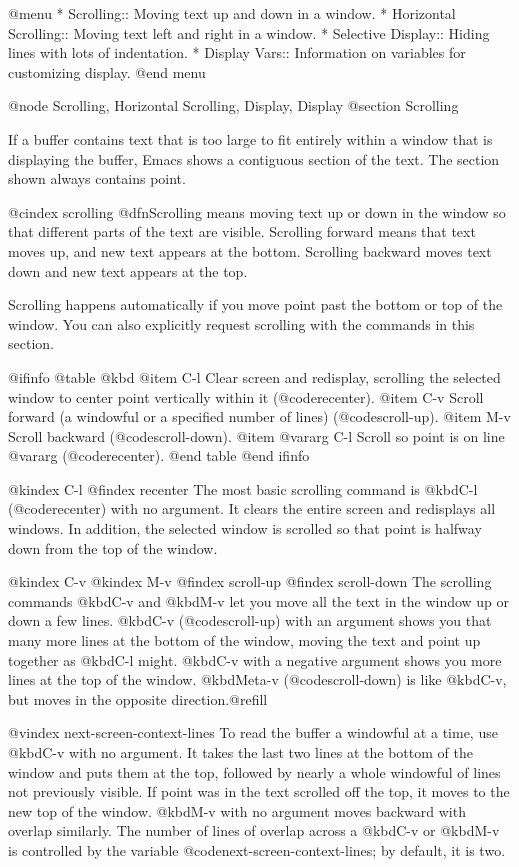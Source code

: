 {{{{{{{{@menu
* Scrolling::	           Moving text up and down in a window.
* Horizontal Scrolling::   Moving text left and right in a window.
* Selective Display::      Hiding lines with lots of indentation.
* Display Vars::           Information on variables for customizing display.
@end menu

@node Scrolling, Horizontal Scrolling, Display, Display
@section Scrolling

  If a buffer contains text that is too large to fit entirely within a
window that is displaying the buffer, Emacs shows a contiguous section of
the text.  The section shown always contains point.

@cindex scrolling
  @dfn{Scrolling} means moving text up or down in the window so that
different parts of the text are visible.  Scrolling forward means that text
moves up, and new text appears at the bottom.  Scrolling backward moves
text down and new text appears at the top.

  Scrolling happens automatically if you move point past the bottom or top
of the window.  You can also explicitly request scrolling with the commands
in this section.

@ifinfo
@table @kbd
@item C-l
Clear screen and redisplay, scrolling the selected window to center
point vertically within it (@code{recenter}).
@item C-v
Scroll forward (a windowful or a specified number of lines) (@code{scroll-up}).
@item M-v
Scroll backward (@code{scroll-down}).
@item @var{arg} C-l
Scroll so point is on line @var{arg} (@code{recenter}).
@end table
@end ifinfo

@kindex C-l
@findex recenter
  The most basic scrolling command is @kbd{C-l} (@code{recenter}) with no
argument.  It clears the entire screen and redisplays all windows.  In
addition, the selected window is scrolled so that point is halfway down
from the top of the window.

@kindex C-v
@kindex M-v
@findex scroll-up
@findex scroll-down
  The scrolling commands @kbd{C-v} and @kbd{M-v} let you move all the text
in the window up or down a few lines.  @kbd{C-v} (@code{scroll-up}) with an
argument shows you that many more lines at the bottom of the window, moving
the text and point up together as @kbd{C-l} might.  @kbd{C-v} with a
negative argument shows you more lines at the top of the window.
@kbd{Meta-v} (@code{scroll-down}) is like @kbd{C-v}, but moves in the
opposite direction.@refill

@vindex next-screen-context-lines
  To read the buffer a windowful at a time, use @kbd{C-v} with no argument.
It takes the last two lines at the bottom of the window and puts them at
the top, followed by nearly a whole windowful of lines not previously
visible.  If point was in the text scrolled off the top, it moves to the
new top of the window.  @kbd{M-v} with no argument moves backward with
overlap similarly.  The number of lines of overlap across a @kbd{C-v} or
@kbd{M-v} is controlled by the variable @code{next-screen-context-lines}; by
default, it is two.

}}}}}}}}
